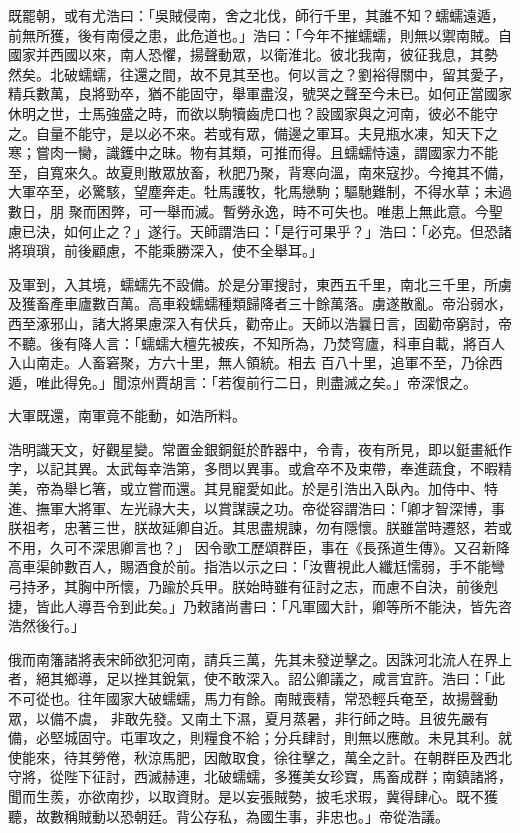 \begin{pinyinscope}
 既罷朝，或有尤浩曰：「吳賊侵南，舍之北伐，師行千里，其誰不知？蠕蠕遠遁，前無所獲，後有南侵之患，此危道也。」浩曰：「今年不摧蠕蠕，則無以禦南賊。自國家并西國以來，南人恐懼，揚聲動眾，以衛淮北。彼北我南，彼征我息，其勢
 然矣。北破蠕蠕，往還之間，故不見其至也。何以言之？劉裕得關中，留其愛子，精兵數萬，良將勁卒，猶不能固守，舉軍盡沒，號哭之聲至今未已。如何正當國家休明之世，士馬強盛之時，而欲以駒犢齒虎口也？設國家與之河南，彼必不能守之。自量不能守，是以必不來。若或有眾，備邊之軍耳。夫見瓶水凍，知天下之寒；嘗肉一臠，識鑊中之昧。物有其類，可推而得。且蠕蠕恃遠，謂國家力不能至，自寬來久。故夏則散眾放畜，秋肥乃聚，背寒向溫，南來寇抄。今掩其不備，大軍卒至，必驚駭，望塵奔走。牡馬護牧，牝馬戀駒；驅馳難制，不得水草；未過數日，朋
 聚而困弊，可一舉而滅。暫勞永逸，時不可失也。唯患上無此意。今聖慮已決，如何止之？」遂行。天師謂浩曰：「是行可果乎？」浩曰：「必克。但恐諸將瑣瑣，前後顧慮，不能乘勝深入，使不全舉耳。」



 及軍到，入其境，蠕蠕先不設備。於是分軍搜討，東西五千里，南北三千里，所虜及獲畜產車廬數百萬。高車殺蠕蠕種類歸降者三十餘萬落。虜遂散亂。帝沿弱水，西至涿邪山，諸大將果慮深入有伏兵，勸帝止。天師以浩曩日言，固勸帝窮討，帝不聽。後有降人言：「蠕蠕大檀先被疾，不知所為，乃焚穹廬，科車自載，將百人入山南走。人畜窘聚，方六十里，無人領統。相去
 百八十里，追軍不至，乃徐西遁，唯此得免。」聞涼州賈胡言：「若復前行二日，則盡滅之矣。」帝深恨之。



 大軍既還，南軍竟不能動，如浩所料。



 浩明識天文，好觀星變。常置金銀銅鋌於酢器中，令青，夜有所見，即以鋌畫紙作字，以記其異。太武每幸浩第，多問以異事。或倉卒不及束帶，奉進蔬食，不暇精美，帝為舉匕箸，或立嘗而還。其見寵愛如此。於是引浩出入臥內。加侍中、特進、撫軍大將軍、左光祿大夫，以賞謀謨之功。帝從容謂浩曰：「卿才智深博，事朕祖考，忠著三世，朕故延卿自近。其思盡規諫，勿有隱懷。朕雖當時遷怒，若或不用，久可不深思卿言也？」
 因令歌工歷頌群臣，事在《長孫道生傳》。又召新降高車渠帥數百人，賜酒食於前。指浩以示之曰：「汝曹視此人纖尪懦弱，手不能彎弓持矛，其胸中所懷，乃踰於兵甲。朕始時雖有征討之志，而慮不自決，前後剋捷，皆此人導吾令到此矣。」乃敕諸尚書曰：「凡軍國大計，卿等所不能決，皆先咨浩然後行。」



 俄而南籓諸將表宋師欲犯河南，請兵三萬，先其未發逆擊之。因誅河北流人在界上者，絕其鄉導，足以挫其銳氣，使不敢深入。詔公卿議之，咸言宜許。浩曰：「此不可從也。往年國家大破蠕蠕，馬力有餘。南賊喪精，常恐輕兵奄至，故揚聲動眾，以備不虞，
 非敢先發。又南土下濕，夏月蒸暑，非行師之時。且彼先嚴有備，必堅城固守。屯軍攻之，則糧食不給；分兵肆討，則無以應敵。未見其利。就使能來，待其勞倦，秋涼馬肥，因敵取食，徐往擊之，萬全之計。在朝群臣及西北守將，從陛下征討，西滅赫連，北破蠕蠕，多獲美女珍寶，馬畜成群；南鎮諸將，聞而生羨，亦欲南抄，以取資財。是以妄張賊勢，披毛求瑕，冀得肆心。既不獲聽，故數稱賊動以恐朝廷。背公存私，為國生事，非忠也。」帝從浩議。




\end{pinyinscope}

